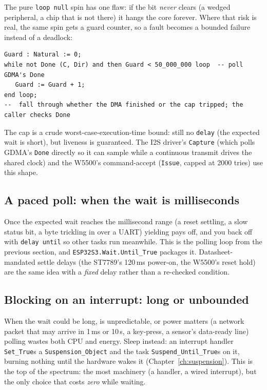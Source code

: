 The pure \texttt{loop null} spin has one flaw: if the bit \emph{never} clears (a
wedged peripheral, a chip that is not there) it hangs the core forever. Where
that risk is real, the same spin gets a guard counter, so a fault becomes a
bounded failure instead of a deadlock:

\begin{lstlisting}
Guard : Natural := 0;
while not Done (C, Dir) and then Guard < 50_000_000 loop  -- poll GDMA's Done
   Guard := Guard + 1;
end loop;
--  fall through whether the DMA finished or the cap tripped; the caller checks Done
\end{lstlisting}

The cap is a crude worst-case-execution-time bound: still no \texttt{delay} (the
expected wait is short), but liveness is guaranteed. The I2S driver's
\texttt{Capture} (which polls GDMA's \texttt{Done} directly so it can sample while
a continuous transmit drives the shared clock) and the W5500's command-accept
(\texttt{Issue}, capped at 2000 tries) use this shape.

\subsection{A paced poll: when the wait is milliseconds}

Once the expected wait reaches the millisecond range (a reset settling, a slow
status bit, a byte trickling in over a UART) yielding pays off, and you back off
with \texttt{delay until} so other tasks run meanwhile. This is the polling loop
from the previous section, and \texttt{ESP32S3.Wait.Until\_True} packages it.
Datasheet-mandated settle delays (the ST7789's 120\,ms power-on, the W5500's reset
hold) are the same idea with a \emph{fixed} delay rather than a re-checked
condition.

\subsection{Blocking on an interrupt: long or unbounded}

When the wait could be long, is unpredictable, or power matters (a network
packet that may arrive in 1\,ms or 10\,s, a key-press, a sensor's data-ready line)
polling wastes both CPU and energy. Sleep instead: an interrupt handler
\texttt{Set\_True}s a \texttt{Suspension\_Object} and the task
\texttt{Suspend\_Until\_True}s on it, burning nothing until the hardware wakes it
(Chapter~\ref{ch:suspension}). This is the top of the spectrum: the most machinery
(a handler, a wired interrupt), but the only choice that costs \emph{zero} while
waiting.

